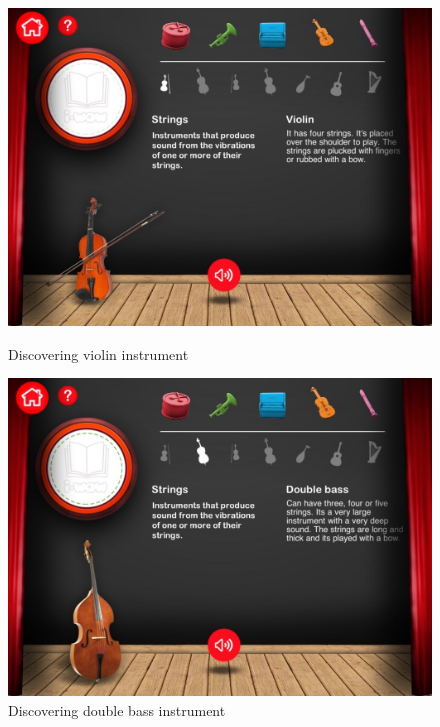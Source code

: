 \begin{figure}[ht!]
  \centering
  \includegraphics[width=350pt]{graphics/additional-screens/discovering_strings_violin_screen.jpg}
  \vspace{0.05cm}
  \caption{Discovering violin instrument}
  \vspace{0.6cm}

  \includegraphics[width=350pt]{graphics/additional-screens/discovering_strings_double_bass_screen.jpg}
  \vspace{0.05cm}
  \caption{Discovering double bass instrument}
\end{figure}

